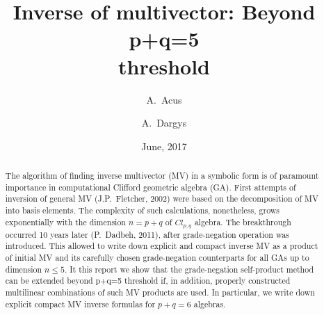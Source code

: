 \documentclass{birkjour}
\begin{document}

\title[Inverse of  multivector: Beyond p+q=5]
 {Inverse of  multivector: Beyond p+q=5\\ threshold}

\author{A.~Acus}
\address{Institute of Theoretical Physics and Astronomy,\br
Vilnius University,\br Saul{\.e}tekio 3, LT-10257 Vilnius,
Lithuania} 

\author{A.~Dargys}

\address{%
Center for Physical Sciences and Technology,\br Semiconductor
Physics Institute,\br Saul{\.e}tekio 3, LT-10257 Vilnius,
Lithuania}



\date{June, 2017}


\begin{abstract}
The algorithm of finding inverse multivector (MV) in a symbolic
form is of paramount importance in computational Clifford
geometric algebra (GA). First attempts of inversion of general MV 
(J.P.~Fletcher, 2002) were based on the decomposition of MV into
basis elements. The complexity of such calculations, nonetheless,
grows exponentially with the dimension $n=p+q$ of $Cl_{p,q}$
algebra. The breakthrough occurred 10 years later (P.~Dadbeh,
2011), after grade-negation operation was introduced. This allowed
to write down  explicit and compact inverse MV as a product of
initial MV and its carefully chosen grade-negation counterparts
for all GAs up to dimension $n\le5$.  It this report we show that
the grade-negation self-product method can be extended beyond
p+q=5 threshold if, in addition, properly constructed multilinear
combinations of such MV products are used. In particular, we write
down explicit compact MV inverse formulas for $p+q=6$ algebras.
\end{abstract}

\maketitle
\end{document}
